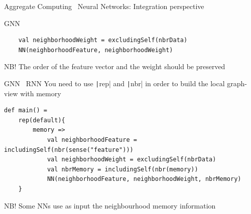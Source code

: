 \documentclass[presentation, 9pt]{beamer}\mode<presentation>{\usetheme{AMSBolognaFC}}
\begin{document}
\begin{frame}{Aggregate Computing \faPlus \, Neural Networks: Integration perspective}
\begin{alertblock}{GNN}
\begin{verbatim}
	val neighborhoodWeight = excludingSelf(nbrData)
	NN(neighborhoodFeature, neighborhoodWeight)
\end{verbatim}
NB! The order of the feature vector and the weight should be preserved
\end{alertblock}
\begin{alertblock}{GNN \faPlus \, RNN}
	You need to use \texttt|rep| and \texttt|nbr| in order to build the local graph-view with memory
\begin{verbatim}
def main() =
	rep(default){
		memory => 
			val neighborhoodFeature = includingSelf(nbr(sense("feature")))
			val neighborhoodWeight = excludingSelf(nbrData)
			val nbrMemory = includingSelf(nbr(memory))
			NN(neighborhoodFeature, neighborhoodWeight, nbrMemory)
	}
\end{verbatim}
NB! Some NNs use as input the neighbourhood memory information
\end{alertblock}
\end{frame}

\end{document}

